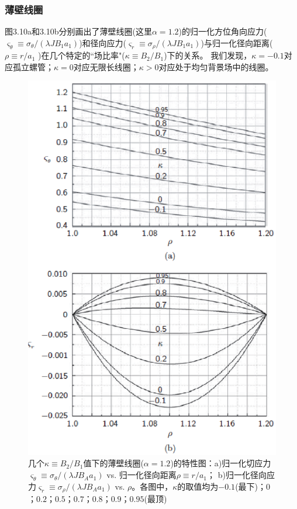 \subsubsection{薄壁线圈}
图3.10a和3.10b分别画出了薄壁线圈(这里$\alpha=1.2$)的归一化方位角向应力($\varsigma_\theta\equiv \sigma_{\theta}/(\lambda J B_1 a_1)$)和径向应力($\varsigma_r\equiv \sigma_{\rho}/(\lambda J B_1 a_1)$)与归一化径向距离($\rho\equiv r/a_1$ )在几个特定的``场比率"($\kappa\equiv B_2/B_1$)下的关系。
我们发现，$\kappa=-0.1$对应孤立螺管；$\kappa=0$对应无限长线圈；$\kappa>0$对应处于均匀背景场中的线圈。
\begin{figure}
  \centering
 \includegraphics[scale=0.9]{chpt3/figs/fig3.10.eps}
  \caption{几个$\kappa\equiv B_2/B_1$值下的薄壁线圈($\alpha=1.2$)的特性图：a)归一化切应力$\varsigma_\theta\equiv \sigma_\theta/(\lambda J B_A a_1)$ vs. 归一化径向距离$\rho\equiv r/a_1$；
  b)归一化径向应力$\varsigma_r \equiv \sigma_\rho/(\lambda J B_A a_1)$ vs.  $\rho$。各图中，$\kappa$的取值均为$-0.1$(最下)；$0$；$0.2$；$0.5$；$0.7$；$0.8$；$0.9$；$0.95$(最顶) }
\end{figure}

